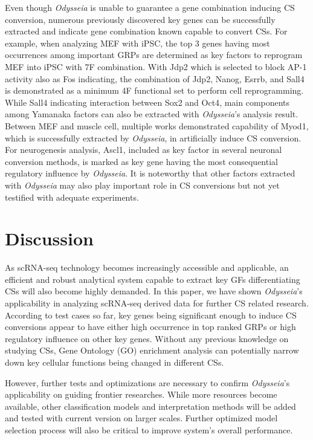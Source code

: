 \documentclass[fleqn,10pt]{wlscirep}
\begin{document}
Even though \emph{Odysseia} is unable to guarantee a gene combination inducing CS conversion, numerous previously discovered key genes can be successfully extracted and indicate gene combination known capable to convert CSs.
For example, when analyzing MEF with iPSC, the top 3 genes having most occurrences among important GRPs are determined as key factors to reprogram MEF into iPSC with 7F combination\cite{ips7f}.
With Jdp2 which is selected to block AP-1 activity also as Fos indicating, the combination of Jdp2, Nanog, Esrrb, and Sall4 is demonstrated as a minimum 4F functional set to perform cell reprogramming\cite{ips7f}.
While Sall4 indicating interaction between Sox2 and Oct4\cite{sall4_oct4_sox2}, main components among Yamanaka factors\cite{yamanaka_2006, osk} can also be extracted with \emph{Odysseia}'s analysis result.
Between MEF and muscle cell, multiple works demonstrated capability of Myod1, which is successfully extracted by \emph{Odysseia}, in artificially induce CS conversion.\cite{myod_1990, myod_crispr}
For neurogenesis analysis, Ascl1, included as key factor in several neuronal conversion methods\cite{ascl1_repro,  ascl1_1frepro}, is marked as key gene having the most consequential regulatory influence by \emph{Odysseia}.
It is noteworthy that other factors extracted with \emph{Odysseia} may also play important role in CS conversions but not yet testified with adequate experiments.


\section*{Discussion}
\label{disc}
As scRNA-seq technology becomes increasingly accessible and applicable, an efficient and robust analytical system capable to extract key GFs differentiating CSs will also become highly demanded.
In this paper, we have shown \emph{Odysseia}'s applicability in analyzing scRNA-seq derived data for further CS related research.
According to test cases so far, key genes being significant enough to induce CS conversions appear to have either high occurrence in top ranked GRPs or high regulatory influence on other key genes.
Without any previous knowledge on studying CSs, Gene Ontology (GO) enrichment analysis can potentially narrow down key cellular functions being changed in different CSs.

However, further tests and optimizations are necessary to confirm \emph{Odysseia}'s applicability on guiding frontier researches.
While more resources become available, other classification models and interpretation methods will be added and tested with current version on larger scales.
Further optimized model selection process will also be critical to improve system's overall performance.
\end{document}
